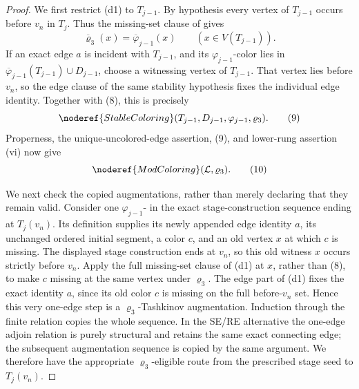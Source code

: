 \begin{proof}
We first restrict (d1) to \(T_{j-1}\).  By hypothesis every vertex of
\(T_{j-1}\) occurs before \(v_n\) in \(T_j\).  Thus the missing-set
clause of  gives
\[
 \overline{\varrho}_3(x)=\overline\varphi_{j-1}(x)
                  \qquad(x\in V(T_{j-1})).                  \tag{8}
\]
If an exact edge \(a\) is incident with \(T_{j-1}\), and its
\(\varphi_{j-1}\)-color lies in
\(\overline\varphi_{j-1}(T_{j-1})\cup D_{j-1}\), choose a witnessing
vertex of \(T_{j-1}\).  That vertex lies before \(v_n\), so the
edge clause of the same stability hypothesis fixes the individual edge
identity.  Together with (8), this is precisely
\[
 \noderef{StableColoring}
   (T_{j-1},D_{j-1},\varphi_{j-1},\varrho_3).                \tag{9}
\]
Properness, the unique-uncolored-edge assertion, (9), and lower-rung
assertion (vi) now give
\[
                       \noderef{ModColoring}(\mathcal L,\varrho_3).
                                                                    \tag{10}
\]

We next check the copied augmentations, rather than merely declaring
that they remain valid.  Consider one
\(\varphi_{j-1}\)- in the exact
stage-construction sequence ending at \(T_j(v_n)\).  Its definition
supplies its newly appended edge identity \(a\), its unchanged ordered
initial segment, a color \(c\), and an old vertex \(x\) at which \(c\)
is missing.  The displayed stage construction ends at \(v_n\), so this
old witness \(x\) occurs strictly before \(v_n\).  Apply the full
missing-set clause of (d1) at \(x\), rather than (8), to make \(c\) missing
at the same vertex under \(\varrho_3\).  The edge part of (d1) fixes the
exact identity \(a\), since its old color \(c\) is missing on the full
before-\(v_n\) set.  Hence this very one-edge
step is a \(\varrho_3\)-Tashkinov augmentation.  Induction through the
finite relation  copies the whole
sequence.  In the SE/RE alternative the one-edge adjoin relation is
purely structural and retains the same exact connecting edge; the
subsequent augmentation sequence is copied by the same argument.  We
therefore have the appropriate \(\varrho_3\)-eligible route from the
prescribed stage seed to \(T_j(v_n)\).                           


\end{proof}
